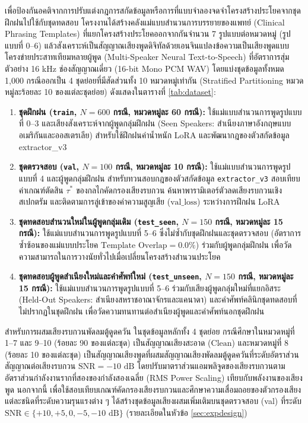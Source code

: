 เพื่อป้องกันอคติจากการปรับแต่งกฎการสกัดข้อมูลหรือการที่แบบจำลองจดจำโครงสร้างประโยคจากชุดฝึกฝนไปใช้กับชุดทดสอบ โครงงานได้สร้างคลังแม่แบบสำนวนการบรรยายของแพทย์ (Clinical Phrasing Templates) ที่แยกโครงสร้างประโยคออกจากกันจำนวน 7 รูปแบบต่อหมวดหมู่ (รูปแบบที่ 0--6) แล้วสังเคราะห์เป็นสัญญาณเสียงพูดดิจิทัลด้วยเอนจินแปลงข้อความเป็นเสียงพูดแบบโครงข่ายประสาทเทียมหลายผู้พูด (Multi-Speaker Neural Text-to-Speech) ที่อัตราการสุ่มตัวอย่าง 16 kHz ช่องสัญญาณเดี่ยว (16-bit Mono PCM WAV) โดยแบ่งชุดข้อมูลทั้งหมด 1,000 กรณีออกเป็น 4 ชุดย่อยที่มีสัดส่วนทั้ง 10 หมวดหมู่เท่ากัน (Stratified Partitioning หมวดหมู่ละร้อยละ 10 ของแต่ละชุดย่อย) ดังแสดงในตารางที่ \ref{tab:dataset}:
\begin{enumerate}[label=(\arabic*), leftmargin=*, align=left]
    \item \textbf{ชุดฝึกฝน (\texttt{train}, $N = 600$ กรณี, หมวดหมู่ละ 60 กรณี):} ใช้แม่แบบสำนวนการพูดรูปแบบที่ 0--3 และเสียงสังเคราะห์จากผู้พูดกลุ่มฝึกฝน (Seen Speakers: สำเนียงภาษาอังกฤษแบบอเมริกันและออสเตรเลีย) สำหรับใช้ฝึกฝนค่าน้ำหนัก LoRA และพัฒนากฎของตัวสกัดข้อมูล extractor\_v3
    \item \textbf{ชุดตรวจสอบ (\texttt{val}, $N = 100$ กรณี, หมวดหมู่ละ 10 กรณี):} ใช้แม่แบบสำนวนการพูดรูปแบบที่ 4 และผู้พูดกลุ่มฝึกฝน สำหรับทวนสอบกฎของตัวสกัดข้อมูล \texttt{extractor\_v3} สอบเทียบค่าเกณฑ์ตัดสิน $\tau^*$ ของกลไกคัดกรองเสียงรบกวน ค้นหาพารามิเตอร์ตัวลดเสียงรบกวนเชิงสเปกตรัม และติดตามการลู่เข้าของค่าความสูญเสีย ($\mathrm{val\_loss}$) ระหว่างการฝึกฝน LoRA
    \item \textbf{ชุดทดสอบสำนวนใหม่ในผู้พูดกลุ่มเดิม (\texttt{test\_seen}, $N = 150$ กรณี, หมวดหมู่ละ 15 กรณี):} ใช้แม่แบบสำนวนการพูดรูปแบบที่ 5--6 ซึ่งไม่ซ้ำกับชุดฝึกฝนและชุดตรวจสอบ (อัตราการซ้ำซ้อนของแม่แบบประโยค $\text{Template Overlap} = 0.0\%$) ร่วมกับผู้พูดกลุ่มฝึกฝน เพื่อวัดความสามารถในการวางนัยทั่วไปเมื่อเปลี่ยนโครงสร้างสำนวนประโยค
    \item \textbf{ชุดทดสอบผู้พูดสำเนียงใหม่และคำศัพท์ใหม่ (\texttt{test\_unseen}, $N = 150$ กรณี, หมวดหมู่ละ 15 กรณี):} ใช้แม่แบบสำนวนการพูดรูปแบบที่ 5--6 ร่วมกับเสียงผู้พูดกลุ่มใหม่ที่แยกอิสระ (Held-Out Speakers: สำเนียงสหราชอาณาจักรและแคนาดา) และคำศัพท์คลินิกชุดทดสอบที่ไม่ปรากฏในชุดฝึกฝน เพื่อวัดความทนทานต่อสำเนียงผู้พูดและคำศัพท์นอกชุดฝึกฝน
\end{enumerate}

สำหรับการผสมเสียงรบกวนพัดลมตู้ดูดควัน ในชุดข้อมูลหลักทั้ง 4 ชุดย่อย กรณีศึกษาในหมวดหมู่ที่ 1--7 และ 9--10 (ร้อยละ 90 ของแต่ละชุด) เป็นสัญญาณเสียงสะอาด ($\mathrm{Clean}$) และหมวดหมู่ที่ 8 (ร้อยละ 10 ของแต่ละชุด) เป็นสัญญาณเสียงพูดที่ผสมสัญญาณเสียงพัดลมตู้ดูดควันที่ระดับอัตราส่วนสัญญาณต่อเสียงรบกวน $\mathrm{SNR} = -10\text{ dB}$ โดยปรับมาตราส่วนแอมพลิจูดของเสียงรบกวนตามอัตราส่วนกำลังงานรากที่สองของกำลังสองเฉลี่ย (RMS Power Scaling) เทียบกับพลังงานของเสียงพูด นอกจากนี้ เพื่อใช้สอบเทียบเกณฑ์คัดกรองเสียงรบกวนและศึกษาความเสื่อมถอยของตัวกรองเสียงแต่ละชนิดที่ระดับความรุนแรงต่าง ๆ ได้สร้างชุดข้อมูลเสียงผสมเพิ่มเติมบนชุดตรวจสอบ (val) ที่ระดับ $\mathrm{SNR} \in \{+10, +5, 0, -5, -10\text{ dB}\}$ (รายละเอียดในหัวข้อ \ref{sec:expdesign})

